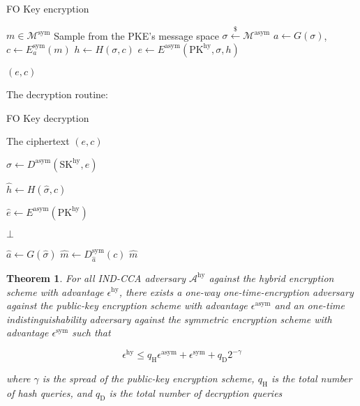 \documentclass{article}
\newcommand{\leftsample}{\overset{{\scriptscriptstyle\$}}{\leftarrow}}
\newtheorem{theorem}{Theorem}[section]
\begin{document}
\begin{algorithm}
\caption{FO Key encryption}\label{fo-key-enc}
\begin{algorithmic}[1]  %
    \Require $m \in \mathcal{M}^\text{sym}$
    \State Sample from the PKE's message space $\sigma \leftsample \mathcal{M}^\text{asym}$
    \State $a \leftarrow G(\sigma)$, $c \leftarrow E^\text{sym}_a(m)$
    \State $h \leftarrow H(\sigma, c)$
    \State $e \leftarrow E^\text{asym}(\text{PK}^\text{hy}, \sigma, h)$

    \Return $(e, c)$
\end{algorithmic}
\end{algorithm}

\pagebreak

The decryption routine:

\begin{algorithm}
\caption{FO Key decryption}\label{fo-key-dec}
\begin{algorithmic}[1]  %
    \Require The ciphertext $(e, c)$

    \State $
        \hat{\sigma} \leftarrow D^\text{asym}(\text{SK}^\text{hy}, e)
    $

    \State $
        \hat{h} \leftarrow H(\hat{\sigma}, c)
    $

    \State $
        \hat{e} \leftarrow E^\text{asym}(\text{PK}^\text{hy})
    $

        \State \Return $\bot$
    \EndIf

    \State $\hat{a} \leftarrow G(\hat{\sigma})$
    \State $\hat{m} \leftarrow D^\text{sym}_{\hat{a}}(c)$
    \State \Return $\hat{m}$
\end{algorithmic}
\end{algorithm}

\begin{theorem}\label{fo-security-theorem}
    For all IND-CCA adversary $\mathcal{A}^\text{hy}$ against the hybrid encryption scheme with advantage $\epsilon^\text{hy}$, there exists a one-way one-time-encryption adversary against the public-key encryption scheme with advantage $\epsilon^\text{asym}$ and an one-time indistinguishability adversary against the symmetric encryption scheme with advantage $\epsilon^\text{sym}$ such that

    \begin{equation*}
        \epsilon^\text{hy} \leq q_\text{H}\epsilon^\text{asym} + \epsilon^\text{sym} + q_\text{D}2^{-\gamma}
    \end{equation*}

    where $\gamma$ is the spread of the public-key encryption scheme, $q_\text{H}$ is the total number of hash queries, and $q_\text{D}$ is the total number of decryption queries
\end{theorem}
\end{document}
